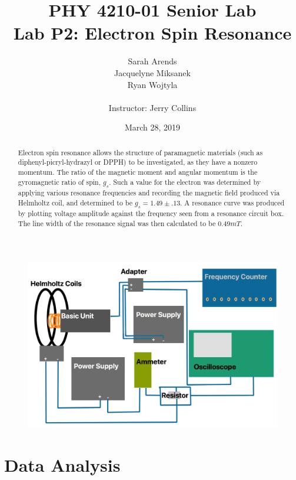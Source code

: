 \documentclass[a4paper]{article}
\title{PHY 4210-01 Senior Lab \\Lab P2: Electron Spin Resonance}
\author{Sarah Arends \\
        Jacquelyne Miksanek \\
        Ryan Wojtyla \\ \\
        Instructor: Jerry Collins}
\date{March 28, 2019}
\begin{document}
\maketitle

\begin{abstract}

\qq Electron spin resonance allows the structure of paramagnetic materials (such as diphenyl-picryl-hydrazyl or DPPH) to be investigated, as they have a nonzero momentum. The ratio of the magnetic moment and angular momentum is the gyromagnetic ratio of spin, $g_s$. Such a value for the
electron was determined by applying various resonance frequencies and recording the magnetic field produced via Helmholtz coil, and determined to be $g_s = 1.49 \pm .13$.  A resonance curve was produced by plotting voltage amplitude against the frequency seen from a resonance circuit box. The line width of the resonance signal was then calculated to be $0.49mT$.

\end{abstract}

\newpage

\tableofcontents

\newpage

\begin{figure}[H]
\centering
\includegraphics[width=1\textwidth]{Circuit_Diagram_P2Lab.png}
\label{Circuit_Diagram}
\end{figure}

\section{Data Analysis}
\end{document}
